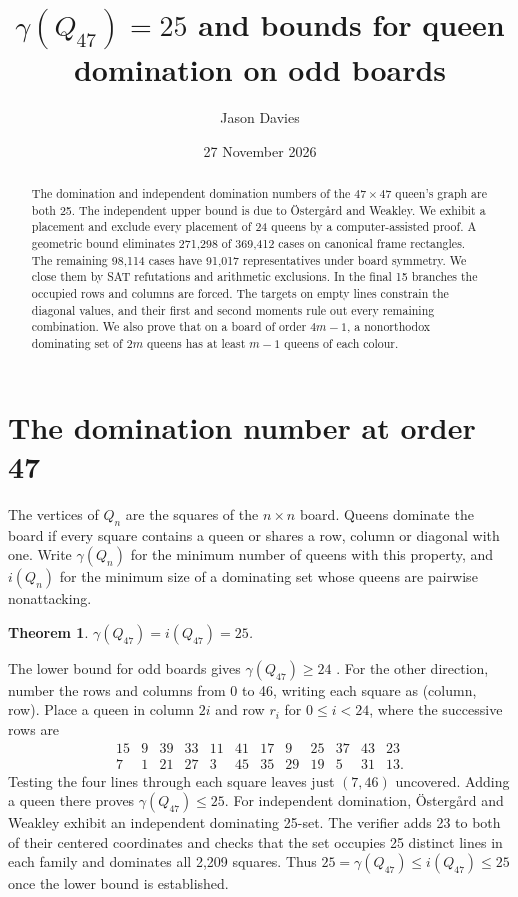 \documentclass[11pt]{article}
\title{$\gamma(Q_{47})=25$ and bounds for queen domination on odd boards}
\author{Jason Davies}
\date{27 November 2026}
\newtheorem{theorem}{Theorem}[section]
\begin{document}
\maketitle

\begin{abstract}
The domination and independent domination numbers of the $47\times47$
queen's graph are both 25. The independent upper bound is due to
\"Osterg{\aa}rd and Weakley. We exhibit a placement and exclude every placement of 24 queens by a
computer-assisted proof. A geometric bound eliminates 271,298 of 369,412
cases on canonical frame rectangles. The remaining 98,114 cases have
91,017 representatives under board symmetry. We close them by SAT
refutations and arithmetic exclusions. In the final 15 branches the occupied rows and
columns are forced. The targets on empty lines constrain the diagonal
values, and their first and second moments rule out every remaining
combination. We also prove that on a board of order $4m-1$, a nonorthodox
dominating set of $2m$ queens has at least $m-1$ queens of each colour.
\end{abstract}

\section{The domination number at order 47}\label{sec:bounds}
The vertices of $Q_n$ are the squares of the $n\times n$ board. Queens
dominate the board if every square contains a queen or shares a row,
column or diagonal with one. Write $\gamma(Q_n)$ for the minimum number
of queens with this property, and $i(Q_n)$ for the minimum size of a
dominating set whose queens are pairwise nonattacking.
\begin{theorem}\label{thm:q47}
\(\gamma(Q_{47})=i(Q_{47})=25\).
\end{theorem}
The lower bound for odd boards gives
$\gamma(Q_{47})\ge24$ \cite{FW}. For the other direction, number the rows
and columns from 0 to 46, writing each square as (column, row). Place a queen in column $2i$ and row $r_i$ for
$0\le i<24$, where the successive rows are
\[
\begin{array}{rrrrrrrrrrrr}
15&9&39&33&11&41&17&9&25&37&43&23\\
7&1&21&27&3&45&35&29&19&5&31&13 .
\end{array}
\]
Testing the four lines through each square leaves just $(7,46)$ uncovered.
Adding a queen there proves $\gamma(Q_{47})\le25$. For independent domination,
\"Osterg{\aa}rd and Weakley \cite[pp.~10--11]{OW} exhibit an independent
dominating 25-set. The verifier adds 23 to both of their centered coordinates
and checks that the set occupies 25 distinct lines in each family and
dominates all 2,209 squares. Thus $25=\gamma(Q_{47})\le i(Q_{47})\le25$
once the lower bound is established.
\end{document}
